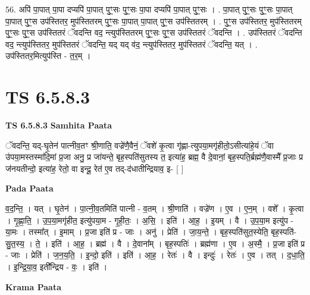 \documentclass[17pt]{extarticle}
\begin{document}
56. अपि॑ पा॒पात् पा॒पा दप्यपि॑ पा॒पात् पुꣳ॒॒सः पुꣳ॒॒सः पा॒पा दप्यपि॑ पा॒पात् पुꣳ॒॒सः । . पा॒पात् पुꣳ॒॒सः पुꣳ॒॒सः पा॒पात् पा॒पात् पुꣳ॒॒स उप॑स्तितर॒ मुप॑स्तितरम् पुꣳ॒॒सः पा॒पात् पा॒पात् पुꣳ॒॒स उप॑स्तितरम् । . पुꣳ॒॒स उप॑स्तितर॒ मुप॑स्तितरम् पुꣳ॒॒सः पुꣳ॒॒स उप॑स्तितरं ॅवदन्ति वद॒ न्त्युप॑स्तितरम् पुꣳ॒॒सः पुꣳ॒॒स उप॑स्तितरं ॅवदन्ति । . उप॑स्तितरं ॅवदन्ति वद॒ न्त्युप॑स्तितर॒ मुप॑स्तितरं ॅवदन्ति॒ यद् यद् व॑द॒ न्त्युप॑स्तितर॒ मुप॑स्तितरं ॅवदन्ति॒ यत् । . उप॑स्तितर॒मित्युप॑स्ति - त॒र॒म् । \newline
\pagebreak
{}

\section{ TS 6.5.8.3 }

\textbf{TS 6.5.8.3 } \newline
\textbf{Samhita Paata} \newline

ॅवदन्ति॒ यद्-घृ॒तेन॑ पात्नीव॒तꣳ श्री॒णाति॒ वज्रे॑णै॒वैनं॒ ॅवशे॑ कृ॒त्वा गृ॑ह्णा-त्युपया॒मगृ॑हीतो॒ऽसीत्या॑हे॒यं ॅवा उ॑पया॒मस्तस्मा॑दि॒मां प्र॒जा अनु॒ प्र जा॑यन्ते॒ बृह॒स्पति॑सुतस्य त॒ इत्या॑ह॒ ब्रह्म॒ वै दे॒वानां॒ बृह॒स्पति॒र्ब्रह्म॑णै॒वास्मै᳚ प्र॒जाः प्र ज॑नयतीन्दो॒ इत्या॑ह॒ रेतो॒ वा इन्दू॒ रेत॑ ए॒व तद्-द॑धातीन्द्रियाव॒ इ- [  ] \newline

\textbf{Pada Paata} \newline

व॒द॒न्ति॒ । यत् । घृ॒तेन॑ । पा॒त्नी॒व॒तमिति॑ पात्नी - व॒तम् । श्री॒णाति॑ । वज्रे॑ण । ए॒व । ए॒न॒म् । वशे᳚ । कृ॒त्वा । गृ॒ह्णा॒ति॒ । उ॒प॒या॒मगृ॑हीत॒ इत्यु॑पया॒म - गृ॒ही॒तः॒ । अ॒सि॒ । इति॑ । आ॒ह॒ । इ॒यम् । वै । उ॒प॒या॒म इत्यु॑प - या॒मः । तस्मा᳚त् । इ॒माम् । प्र॒जा इति॑ प्र - जाः । अनु॑ । प्रेति॑ । जा॒य॒न्ते॒ । बृह॒स्पति॑सुत॒स्येति॒ बृह॒स्पति॑-सु॒त॒स्य॒ । ते॒ । इति॑ । आ॒ह॒ । ब्रह्म॑ । वै । दे॒वाना᳚म् । बृह॒स्पतिः॑ । ब्रह्म॑णा । ए॒व । अ॒स्मै॒ । प्र॒जा इति॑ प्र - जाः । प्रेति॑ । ज॒न॒य॒ति॒ । इ॒न्दो॒ इति॑ । इति॑ । आ॒ह॒ । रेतः॑ । वै । इन्दुः॑ । रेतः॑ । ए॒व । तत् । द॒धा॒ति॒ । इ॒न्द्रि॒या॒व॒ इती᳚न्द्रिय - वः॒ । इति॑ ।  \newline


\textbf{Krama Paata} \newline
\end{document}
